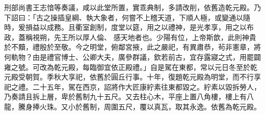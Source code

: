 \begin{pinyinscope}
 刑部尚書王志愔等奏議，咸以此堂所置，實乖典制，多請改削，依舊造乾元殿。乃下詔曰：「古之操插皇綱、執大象者，何嘗不上稽天道，下順人極，或變通以隨時，爰損益以成務。且衢室創制，度堂以筵，用之以禮神，是光孝享，用之以布政，蓋稱視朔，先王所以厚人倫、
 感天地者也。少陽有位，上帝斯歆，此則神貴於不黷，禮殷於至敬。今之明堂，俯鄰宮掖，此之嚴祀，有異肅恭，茍非憲章，將何軌物？由是禮官博士、公卿大夫，廣參群議，欽若前古，宜存露寢之式，用罷闢雍之號。可改為乾元殿，每臨御宜依正殿禮。」自是駕在東都，常以元日冬至於乾元殿受朝賀。季秋大享祀，依舊於圓丘行事。十年，復題乾元殿為明堂，而不行享祀之禮。二十五年，駕在西京，詔將作大匠康紵素往東都毀之。紵素以毀拆勞人，
 乃奏請且拆上層，卑於舊制九十五尺。又去柱心木，平座上置八角樓，樓上有八龍，騰身捧火珠。又小於舊制，周圍五尺，覆以真瓦，取其永逸。依舊為乾元殿。



\end{pinyinscope}